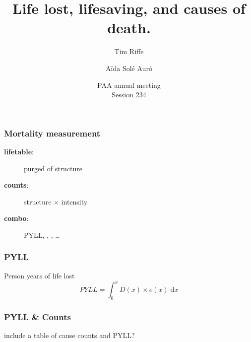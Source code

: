 \documentclass{beamer}
\title[Years Lost]{Life lost, lifesaving, and causes of death.}
\author[Riffe \& Sol\'{e}]
{
Tim Riffe \inst{1} \and A{\"i}da Sol\'{e} Aur\'{o} \inst{2}}
\institute[VFU] %
{
  \inst{1}%
  Department of Demography\\
  University of California, Berkeley
  \and
  \inst{2}%
  Universitat Pompeu Fabra
}
\date[May 2, 2015] %
{PAA annual meeting\\ Session 234}
\newcommand{\dd}{\; \mathrm{d}}
\begin{document}
\begin{frame}
\titlepage %
\end{frame}

\begin{frame}
\frametitle{Mortality measurement}
\begin{description}
\item[\textbf{lifetable}:] purged of structure
\item[\textbf{counts}:] structure $\times$ intensity
\item[\textbf{combo}:] PYLL, \underline{\hspace{1cm}}, \underline{\hspace{1cm}},
\ldots
\end{description}

\end{frame}

\begin{frame}
\frametitle{PYLL}
Person years of life lost
\begin{equation}
PYLL = \int_0^\omega D(x) \times e(x) \dd x
\end{equation}
\end{frame}


\begin{frame}
\frametitle{PYLL \& Counts}
include a table of cause counts and PYLL?
\end{frame}

\begin{frame}

\end{frame}
\begin{frame}

\end{frame}
\end{document}
